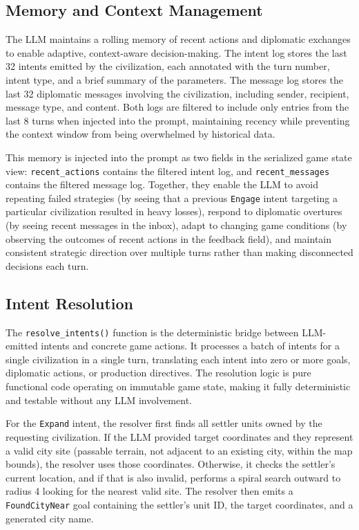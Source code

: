 \documentclass[conference]{IEEEtran}
\begin{document}
\subsection{Memory and Context Management}

The LLM maintains a rolling memory of recent actions and diplomatic exchanges to enable adaptive, context-aware decision-making. The intent log stores the last 32 intents emitted by the civilization, each annotated with the turn number, intent type, and a brief summary of the parameters. The message log stores the last 32 diplomatic messages involving the civilization, including sender, recipient, message type, and content. Both logs are filtered to include only entries from the last 8 turns when injected into the prompt, maintaining recency while preventing the context window from being overwhelmed by historical data.

This memory is injected into the prompt as two fields in the serialized game state view: \texttt{recent\_actions} contains the filtered intent log, and \texttt{recent\_messages} contains the filtered message log. Together, they enable the LLM to avoid repeating failed strategies (by seeing that a previous \texttt{Engage} intent targeting a particular civilization resulted in heavy losses), respond to diplomatic overtures (by seeing recent messages in the inbox), adapt to changing game conditions (by observing the outcomes of recent actions in the feedback field), and maintain consistent strategic direction over multiple turns rather than making disconnected decisions each turn.

\subsection{Intent Resolution}

The \texttt{resolve\_intents()} function is the deterministic bridge between LLM-emitted intents and concrete game actions. It processes a batch of intents for a single civilization in a single turn, translating each intent into zero or more goals, diplomatic actions, or production directives. The resolution logic is pure functional code operating on immutable game state, making it fully deterministic and testable without any LLM involvement.

For the \texttt{Expand} intent, the resolver first finds all settler units owned by the requesting civilization. If the LLM provided target coordinates and they represent a valid city site (passable terrain, not adjacent to an existing city, within the map bounds), the resolver uses those coordinates. Otherwise, it checks the settler's current location, and if that is also invalid, performs a spiral search outward to radius 4 looking for the nearest valid site. The resolver then emits a \texttt{FoundCityNear} goal containing the settler's unit ID, the target coordinates, and a generated city name.
\end{document}
